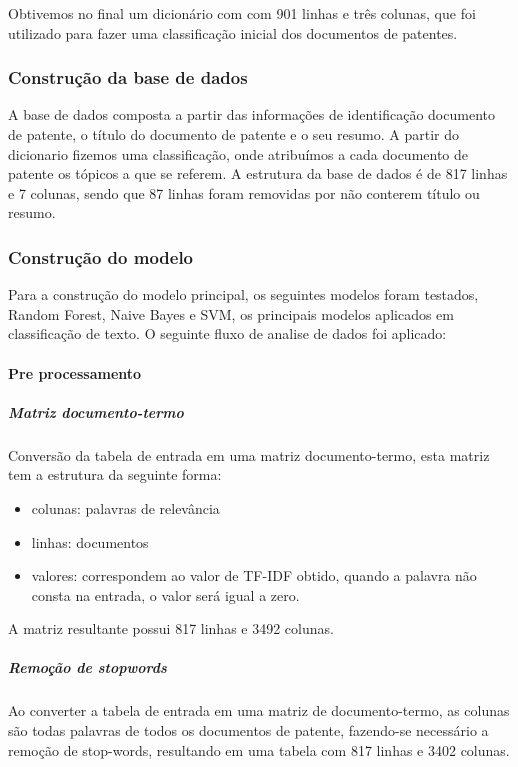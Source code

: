 Obtivemos no final um dicionário com com 901 linhas e três colunas, que foi utilizado para fazer uma classificação inicial dos documentos de patentes. 

\subsubsection{Construção da base de dados}

A base de dados composta a partir das informações de identificação documento de patente, o título do documento de patente e o seu resumo. A partir do dicionario fizemos uma classificação, onde atribuímos a cada documento de patente os tópicos a que se referem. A estrutura da base de dados é de 817 linhas e 7 colunas, sendo que 87 linhas foram removidas por não conterem título ou resumo.

\subsubsection{Construção do modelo}

Para a construção do modelo principal, os seguintes modelos foram testados, Random Forest, Naive Bayes e SVM, os principais modelos aplicados em classificação de texto. O seguinte fluxo de analise de dados foi aplicado:

\paragraph{Pre processamento}

\subparagraph{Matriz documento-termo}

Conversão da tabela de entrada em uma matriz documento-termo, esta matriz tem a estrutura da seguinte forma:

\begin{itemize}
  \item colunas: palavras de relevância
  \item linhas: documentos
  \item valores: correspondem ao valor de TF-IDF obtido, quando a palavra não consta na entrada, o valor será igual a zero.
\end{itemize}

A matriz resultante possui 817 linhas e 3492 colunas.
	
\subparagraph{Remoção de stopwords}

Ao converter a tabela de entrada em uma matriz de documento-termo, as colunas são todas palavras de todos os documentos de patente, fazendo-se necessário a remoção de stop-words, resultando em uma tabela com 817 linhas e 3402 colunas.

